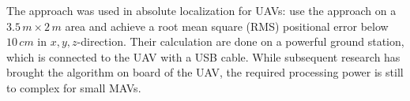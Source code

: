The approach was used in absolute localization for UAVs: \citet{blosch2010vision} use the approach on a $3.5\,m \times 2\,m$ area and achieve a root mean square (RMS) positional error below $10\,cm$ in $x,y,z$-direction. Their calculation are done on a powerful ground station, which is connected to the UAV with a USB cable. While subsequent research has brought the algorithm on board of the UAV, the required processing power is still to complex for small MAVs.  